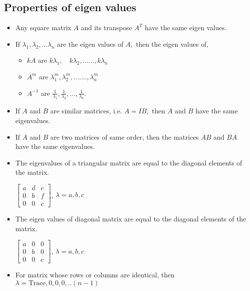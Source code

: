 \subsection{Properties of eigen values}
\begin{itemize}
	\item  Any square matrix $A$ and its transpose $A^{T}$ have the same eigen values.
    \item If $\lambda_{1}, \lambda_{2}, \ldots \lambda_{n}$ are the eigen values of $A,$ then the eigen values of,
	\begin{itemize}
		\item  $k A$ are $k \lambda_{1}, \quad k \lambda_{2}, \ldots \ldots, k \lambda_{n}$\\
		\item  $A^{m}$ are $\lambda_{1}^{m}, \lambda_{2}^{m}, \ldots \ldots ., \lambda_{n}^{m}$\\
		\item $A^{-1}$ are $\frac{1}{\lambda_{1}}, \frac{1}{\lambda_{2}}, \ldots, \frac{1}{\lambda_{n}}$.
	\end{itemize}
	\item  If $A$ and $B$ are similar matrices, i.e. $A=I B,$ then $A$ and $B$ have the same eigenvalues.
\item  If $A$ and $B$ are two matrices of same order, then the matrices $A B$ and $B A$ have the same eigenvalues.
\item  The eigenvalues of a triangular matrix are equal to the diagonal elements of the matrix.
\begin{example}
		$\left[\begin{array}{ccc}a & d & e \\ 0 & b & f \\ 0 & 0 & c\end{array}\right]$, $ \lambda=a,b,c$
\end{example}
\item The eigen values of diagonal matrix are equal to the diagonal elements of the matrix.
\begin{example}
	$\left[\begin{array}{ccc}a & 0 & 0 \\ 0 & b & 0 \\ 0 & 0 & c\end{array}\right]$, $ \lambda=a,b,c$
\end{example}
\item For matrix whose rows or columns are identical, then $ \lambda=\text{Trace},0,0,0,..(n-1)$
\begin{example}

\end{example}
\end{itemize}
